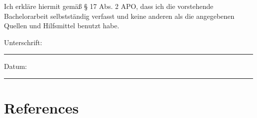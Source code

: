 \documentclass[
11pt, %
english, %
singlespacing, %
parskip, %
headsepline, %
]{MastersDoctoralThesis} %
\newcommand{\abschluss}{Bachelor}
\begin{document}
\pagestyle{thesis} %

%
%
%
%


\appendix %



%
%


\begin{declaration}
\addchaptertocentry{\authorshipname} %
Ich erkläre hiermit gemäß § 17 Abs. 2 APO, dass ich die vorstehende {\abschluss}arbeit selbstständig verfasst und keine anderen als die angegebenen Quellen und Hilfsmittel benutzt habe.


\noindent Unterschrift:\\
\rule[0.5em]{25em}{0.5pt} %

\noindent Datum:\\
\rule[0.5em]{25em}{0.5pt} %
\end{declaration}

\setcounter{chapter}{-1}
\chapter{References}
\begin{multicols}{2}%
	\begin{refcontext}[sorting=nyt] %
		\renewcommand*{\bibfont}{\small\raggedright}
		\linespread{1.2}\selectfont
		\printbibliography[heading=none]
	\end{refcontext}
\end{multicols}

\end{document}
